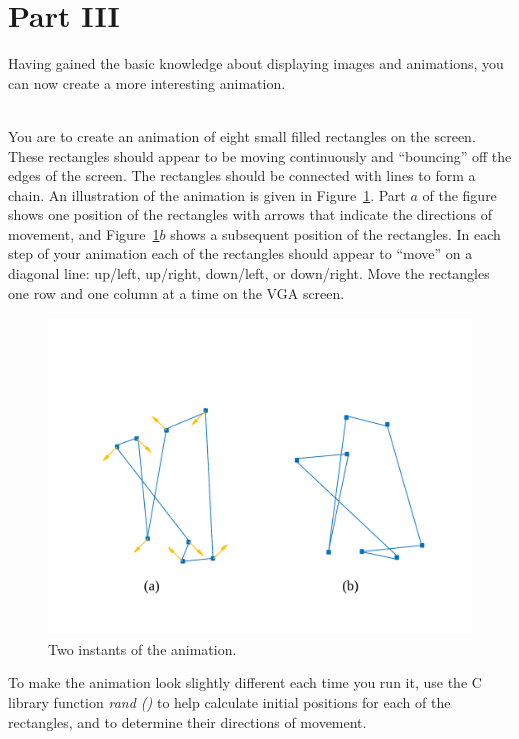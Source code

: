 \documentclass[epsfig,10pt,fullpage]{article}
\begin{document}
\section*{Part III}
Having gained the basic knowledge about displaying images and animations, you can now create 
a more interesting animation.

~\\
You are to create an animation of eight small filled rectangles on the screen. These rectangles 
should appear to be moving continuously and ``bouncing'' off the edges of the screen. The 
rectangles should be connected with lines to form a chain. An illustration of the animation 
is given in Figure~\ref{fig:animation_example}. Part $a$ of the figure shows one position
of the rectangles with arrows that indicate the directions of movement, and 
Figure~\ref{fig:animation_example}$b$ shows a subsequent position of the rectangles. 
In each step of your animation each of the rectangles should appear to ``move'' on a diagonal 
line: up/left, up/right, down/left, or down/right. Move the rectangles one
row and one column at a time on the VGA screen.

\begin{figure}[h!]
   \begin{center}
       \includegraphics[scale = 0.5]{figures/fig_animation_example.pdf}
   \end{center}
   \caption{Two instants of the animation.}
	\label{fig:animation_example}
\end{figure}

To make the animation look slightly different each time you run it, use the C library function 
{\it rand ()} to help calculate initial positions for each of the rectangles, and to determine 
their directions of movement. 
\end{document}
